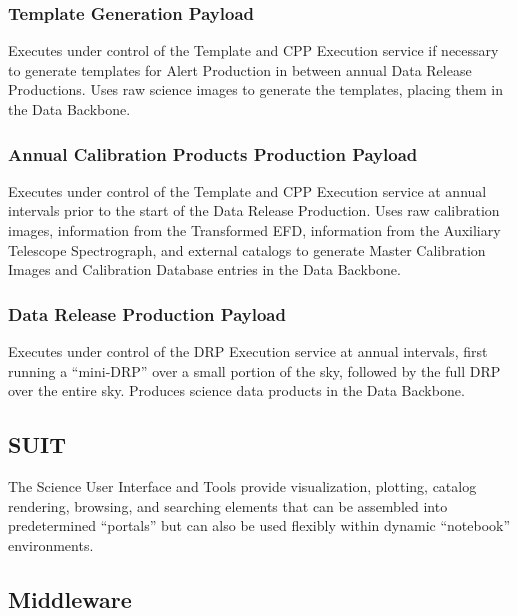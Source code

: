 \documentclass[DM,lsstdraft,toc]{lsstdoc}
\begin{document}
\subsubsection{Template Generation
Payload}\label{template-generation-payload}

Executes under control of the Template and CPP Execution service if
necessary to generate templates for Alert Production in between annual
Data Release Productions. Uses raw science images to generate the
templates, placing them in the Data Backbone.

\subsubsection{Annual Calibration Products Production
Payload}\label{annual-calibration-products-production-payload}

Executes under control of the Template and CPP Execution service at
annual intervals prior to the start of the Data Release Production. Uses
raw calibration images, information from the Transformed EFD,
information from the Auxiliary Telescope Spectrograph, and external
catalogs to generate Master Calibration Images and Calibration Database
entries in the Data Backbone.

\subsubsection{Data Release Production
Payload}\label{data-release-production-payload}

Executes under control of the DRP Execution service at annual intervals,
first running a ``mini-DRP'' over a small portion of the sky, followed
by the full DRP over the entire sky. Produces science data products in
the Data Backbone.

\subsection{SUIT}\label{suit}

The Science User Interface and Tools provide visualization, plotting,
catalog rendering, browsing, and searching elements that can be
assembled into predetermined ``portals'' but can also be used flexibly
within dynamic ``notebook'' environments.

\subsection{Middleware}\label{middleware}
\end{document}
